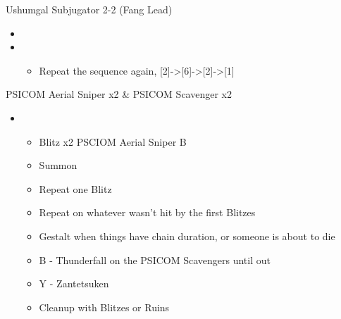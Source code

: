 \begin{battle}{Ushumgal Subjugator 2-2 (Fang Lead)}
\begin{itemize}
    \begin{itemize}
        \item Auto-defend
        \item Potion
        \item Potion if Fang's HP isn't green, otherwise Provoke x3
    \end{itemize}
    \item \stagger
    \item \second
    \begin{itemize}
        \item Repeat the sequence again, [2]->[6]->[2]->[1]
    \end{itemize}
\end{itemize}
\end{battle}
\renewcommand{\second}{[2] Relentless Assault (\rav/\com/\rav)}
\begin{battle}{PSICOM Aerial Sniper x2 \& PSICOM Scavenger x2}
\begin{itemize}
    \item \first
    \begin{itemize}
        \item Blitz x2 PSCIOM Aerial Sniper B
        \item Summon
        \item Repeat one Blitz
        \item Repeat on whatever wasn't hit by the first Blitzes
        \item Gestalt when things have chain duration, or someone is about to die
        \item B - Thunderfall on the PSICOM Scavengers until out
        \item Y - Zantetsuken
        \item Cleanup with Blitzes or Ruins
    \end{itemize}
\end{itemize}
 
\end{battle}
